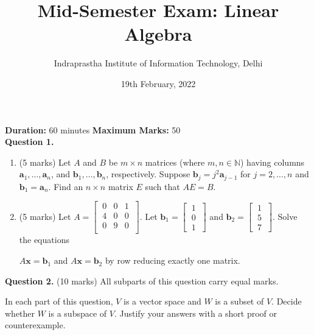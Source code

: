 \documentclass{article}
\title{Mid-Semester Exam: Linear Algebra}
\author{Indraprastha Institute of Information Technology, Delhi}
\date{19th February, 2022}
\newcommand{\N}{\mathbb{N}}
\newcommand{\column}[3]{\begin{bmatrix}\ #1\ \\ \ #2\ \\ \ #3\ \end{bmatrix}}
\begin{document}

\maketitle

\textbf{Duration:} 60 minutes \hfill \textbf{Maximum Marks:} 50 \\[5mm]

\textbf{Question 1.}
\begin{enumerate}[label=(\alph*), leftmargin=6.25mm]
    \item (5 marks) Let $A$ and $B$ be $m \times n$ matrices (where $m, n \in \N$) having columns $\textbf{a}_1, \ldots , \textbf{a}_n$, and $\textbf{b}_1, \ldots, \textbf{b}_n$, respectively. Suppose $\textbf{b}_j = j^2 \textbf{a}_{j-1}$ for $j = 2, \ldots, n$ and $\textbf{b}_1 = \textbf{a}_n$. Find an $ n \times n$ matrix $E$ such that $AE = B$.

    \item (5 marks) Let $A = \begin{bmatrix}
        \ 0 & 0 & 1\ \\
        \ 4 & 0 & 0\ \\
        \ 0 & 9 & 0\ \\
    \end{bmatrix}$. Let $\textbf{b}_1 = \column{1}{0}{1}$ and $\textbf{b}_2 = \column{1}{5}{7}$. Solve the equations

    $A\textbf{x} = \textbf{b}_1$ and $A\textbf{x} = \textbf{b}_2$ by row reducing exactly one matrix. \\[8mm]
\end{enumerate}


\textbf{Question 2.} (10 marks)
All subparts of this question carry equal marks.

In each part of this question, $V$ is a vector space and $W$ is a subset of $V$. Decide whether $W$ is a subspace of $V$. Justify your answers with a short proof or counterexample.
\end{document}
